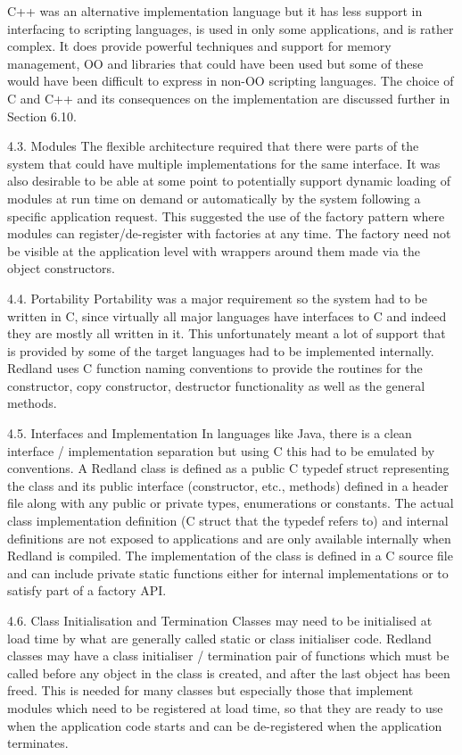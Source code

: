 \documentclass[11pt]{article}
\begin{document}
    C++ was an alternative implementation language but it has less support in interfacing to scripting languages, is used in only some applications, and is rather complex. It does provide powerful techniques and support for memory management, OO and libraries that could have been used but some of these would have been difficult to express in non-OO scripting languages. The choice of C and C++ and its consequences on the implementation are discussed further in Section 6.10.

    4.3. Modules
    The flexible architecture required that there were parts of the system that could have multiple implementations for the same interface. It was also desirable to be able at some point to potentially support dynamic loading of modules at run time on demand or automatically by the system following a specific application request. This suggested the use of the factory pattern where modules can register/de-register with factories at any time. The factory need not be visible at the application level with wrappers around them made via the object constructors.

    4.4. Portability
    Portability was a major requirement so the system had to be written in C, since virtually all major languages have interfaces to C and indeed they are mostly all written in it. This unfortunately meant a lot of support that is provided by some of the target languages had to be implemented internally. Redland uses C function naming conventions to provide the routines for the constructor, copy constructor, destructor functionality as well as the general methods.

    4.5. Interfaces and Implementation
    In languages like Java, there is a clean interface / implementation separation but using C this had to be emulated by conventions. A Redland class is defined as a public C typedef struct representing the class and its public interface (constructor, etc., methods) defined in a header file along with any public or private types, enumerations or constants. The actual class implementation definition (C struct that the typedef refers to) and internal definitions are not exposed to applications and are only available internally when Redland is compiled. The implementation of the class is defined in a C source file and can include private static functions either for internal implementations or to satisfy part of a factory API.

    4.6. Class Initialisation and Termination
    Classes may need to be initialised at load time by what are generally called static or class initialiser code. Redland classes may have a class initialiser / termination pair of functions which must be called before any object in the class is created, and after the last object has been freed. This is needed for many classes but especially those that implement modules which need to be registered at load time, so that they are ready to use when the application code starts and can be de-registered when the application terminates.
\end{document}
